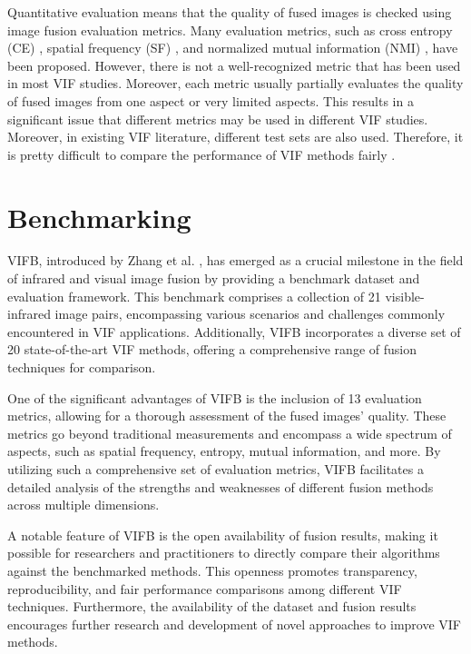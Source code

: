 Quantitative evaluation means that the quality of fused images is checked using image fusion evaluation metrics. Many evaluation metrics, such as cross entropy (CE) \cite{bulanon2009image}, spatial frequency (SF) \cite{eskicioglu1995image}, and normalized mutual information (NMI) \cite{hossny2008comments}, have been proposed. However, there is not a well-recognized metric that has been used in most VIF studies. Moreover, each metric usually partially evaluates the quality of fused images from one aspect or very limited aspects. This results in a significant issue that different metrics may be used in different VIF studies. Moreover, in existing VIF literature, different test sets are also used. Therefore, it is pretty difficult to compare the performance of VIF methods fairly \cite{bulanon2009image, eskicioglu1995image, hossny2008comments}.

\section{Benchmarking}
\label{subsec:Benchmarking}

VIFB, introduced by Zhang et al. \cite{zhang2020vifb}, has emerged as a crucial milestone in the field of infrared and visual image fusion by providing a benchmark dataset and evaluation framework. This benchmark comprises a collection of 21 visible-infrared image pairs, encompassing various scenarios and challenges commonly encountered in VIF applications. Additionally, VIFB incorporates a diverse set of 20 state-of-the-art VIF methods, offering a comprehensive range of fusion techniques for comparison.

One of the significant advantages of VIFB is the inclusion of 13 evaluation metrics, allowing for a thorough assessment of the fused images' quality. These metrics go beyond traditional measurements and encompass a wide spectrum of aspects, such as spatial frequency, entropy, mutual information, and more. By utilizing such a comprehensive set of evaluation metrics, VIFB facilitates a detailed analysis of the strengths and weaknesses of different fusion methods across multiple dimensions.

A notable feature of VIFB is the open availability of fusion results, making it possible for researchers and practitioners to directly compare their algorithms against the benchmarked methods. This openness promotes transparency, reproducibility, and fair performance comparisons among different VIF techniques. Furthermore, the availability of the dataset and fusion results encourages further research and development of novel approaches to improve VIF methods.

